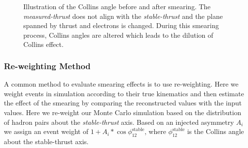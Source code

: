 \begin{figure}[H]
  \centering     
  \caption{Illustration of the Collins angle before and after smearing. The {\em measured-thrust} does not align with the {\em stable-thrust} and the plane spanned by thrust and electrons is changed. During this smearing process, Collins angles are altered which leads to the dilution of Collins effect.}
  \label{fig:SmearIllustr}
\end{figure}

\subsubsection{\texorpdfstring{Re-weighting Method}{Re-weighting Method}} 
\label{sec:pi0thrustcorrection}
A common method to evaluate smearing effects is to use re-weighting. Here we weight events in simulation according to their true kinematics and then estimate the effect of the smearing by comparing the reconstructed values with the input values.
 Here we re-weight our Monte Carlo simulation based on the distribution of hadron pairs about the {\em stable-thrust} axis. Based on an injected asymmetry $A_i$ we assign an event weight of $1+A_i*\cos\phi_{12}^{\text{stable}}$, where $\phi_{12}^\text{stable}$ is the Collins angle about the stable-thrust axis.

